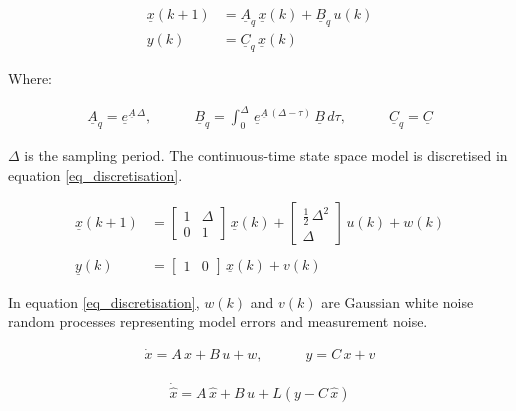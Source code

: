 \documentclass[fleqn,10pt]{olplainarticle}
\begin{document}
\begin{align}
    \underline{x}(k+1) &= \underline{A}_q \, \underline{x}(k) + \underline{B}_q \, u(k)\nonumber\\
    y(k) &= \underline{C}_q \, \underline{x}(k)
\end{align}

 Where:

\begin{align}
    \underline{A}_q = \underline{e}^{\underline{A} \, \Delta}, \quad \quad \quad \underline{B}_q = \int_0^\Delta \, \underline{e}^{\underline{A}\,(\Delta-\tau)} \, \underline{B} \, d\tau, \quad \quad \quad \underline{C}_q = \underline{C}
\end{align}

 $\Delta$ is the sampling period. The continuous-time state space model is discretised in equation \ref{eq_discretisation}.

\begin{align}
\underline{x}(k+1) &= 
\begin{bmatrix}
1 & \Delta\\
0 & 1
\end{bmatrix}
\,
\underline{x}(k) + 
\begin{bmatrix}
\frac{1}{2} \, \Delta^2\\
\Delta
\end{bmatrix}
\,
u(k) + w(k) \nonumber\\
 \nonumber\\
 \underline{y}(k) &=
\begin{bmatrix}
1 & 0 
\end{bmatrix}
\,
\underline{x}(k) + v(k)
    \label{eq_discretisation}
\end{align}

In equation \ref{eq_discretisation}, $w(k)$ and $v(k)$ are Gaussian white noise random processes representing model errors and measurement noise.

\begin{align}
    \dot{x} = A \, x + B \, u + w, \quad \quad \quad y = C \, x + v
\end{align}


\begin{align}
    \dot{\hat{x}} = A \, \hat{x} + B \, u + L(y - C \, \hat{x})
\end{align}
\end{document}
